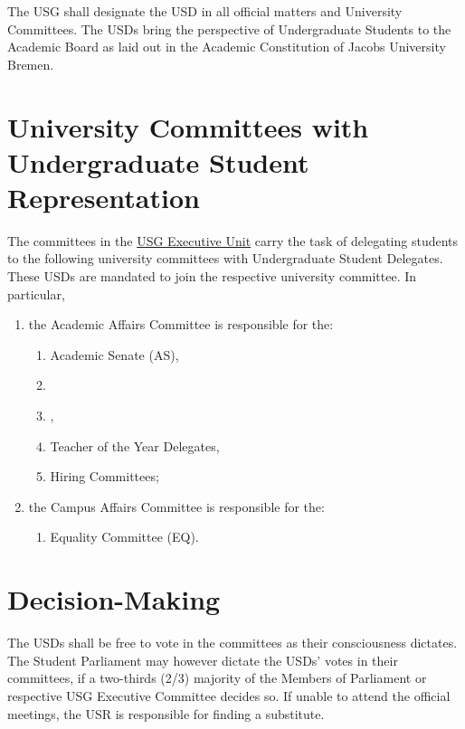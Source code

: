 
The USG shall designate the \ac{USD} in all official matters and University Committees. The USDs bring the perspective of Undergraduate Students to the Academic Board as laid out in the Academic Constitution of Jacobs University Bremen. 

\section{University Committees with Undergraduate Student Representation}
The committees in the \hyperref[USGexecutiveUnitDef]{USG Executive Unit} carry the task of delegating students to the following university committees with Undergraduate Student Delegates. These USDs are mandated to join the respective university committee. In particular,
\begin{enumerate}
\item the Academic Affairs Committee is responsible for  the:
\begin{enumerate}
    \item Academic Senate (AS),
    \item {}
    \item {},
    \item Teacher of the Year Delegates,
    \item Hiring Committees;
\end{enumerate}

\item the Campus Affairs Committee is responsible for  the:
\begin{enumerate}
    \item Equality Committee (EQ).
\end{enumerate}
\end{enumerate}

\section{Decision-Making}
The USDs shall be free to vote in the  committees as their consciousness dictates. The Student Parliament may however dictate the USDs' votes in their  committees, if a two-thirds (2/3) majority of the Members of Parliament or respective USG Executive Committee decides so. If unable to attend the official meetings, the USR is responsible for finding a substitute.

